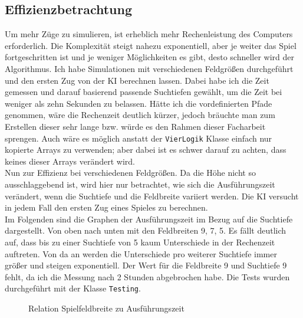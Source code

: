 \documentclass[12pt,a4paper]{article}
\def\code#1{\texttt{#1}}
\begin{document}
	\subsection{Effizienzbetrachtung}
	Um mehr Züge zu simulieren, ist erheblich mehr Rechenleistung des Computers erforderlich. Die Komplexität steigt nahezu exponentiell, aber je weiter das Spiel fortgeschritten ist und je weniger Möglichkeiten es gibt, desto schneller wird der Algorithmus. Ich habe Simulationen mit verschiedenen Feldgrößen durchgeführt und den ersten Zug von der KI berechnen lassen. Dabei habe ich die Zeit gemessen und darauf basierend passende Suchtiefen gewählt, um die Zeit bei weniger als zehn Sekunden zu belassen. Hätte ich die vordefinierten Pfade genommen, wäre die Rechenzeit deutlich kürzer, jedoch bräuchte man zum Erstellen dieser sehr lange bzw. würde es den Rahmen dieser Facharbeit sprengen. Auch wäre es möglich anstatt der \code{VierLogik} Klasse einfach nur kopierte Arrays zu verwenden; aber dabei ist es schwer darauf zu achten, dass keines dieser Arrays verändert wird.\\
	Nun zur Effizienz bei verschiedenen Feldgrößen. Da die Höhe nicht so ausschlaggebend ist, wird hier nur betrachtet, wie sich die Ausführungszeit verändert, wenn die Suchtiefe und die Feldbreite variiert werden. Die KI versucht in jedem Fall den ersten Zug eines Spieles zu berechnen.\\
	Im Folgenden sind die Graphen der Ausführungszeit im Bezug auf die Suchtiefe dargestellt. Von oben nach unten mit den Feldbreiten 9, 7, 5. Es fällt deutlich auf, dass bis zu einer Suchtiefe von 5 kaum Unterschiede in der Rechenzeit auftreten. Von da an werden die Unterschiede pro weiterer Suchtiefe immer größer und steigen exponentiell. Der Wert für die Feldbreite 9 und Suchtiefe 9 fehlt, da ich die Messung nach 2 Stunden abgebrochen habe. Die Tests wurden durchgeführt mit der Klasse \code{Testing}.\\
		\begin{figure}[h]
			\centering
			\label{fig:graph1}
		\caption{Relation Spielfeldbreite zu Ausführungszeit}
		\end{figure}
\end{document}
